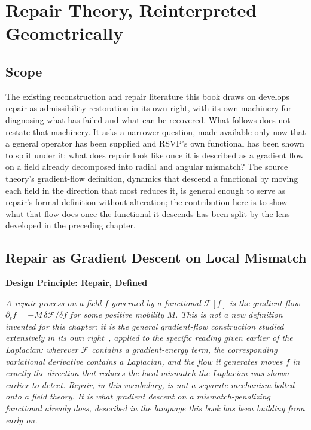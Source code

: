 \documentclass[11pt,fleqn]{book}
\numberwithin{equation}{chapter}
\newenvironment{principle}[1]
  {\begin{principleEnv}
   \noindent\textbf{Design Principle: #1}\par\smallskip\itshape}
  {\end{principleEnv}}
\theoremstyle{plain}
\theoremstyle{definition}
\theoremstyle{remark}
\begin{document}

\chapter{Repair Theory, Reinterpreted Geometrically}

\section{Scope}

The existing reconstruction and repair literature this book draws on develops repair as admissibility restoration in its own right, with its own machinery for diagnosing what has failed and what can be recovered. What follows does not restate that machinery. It asks a narrower question, made available only now that a general operator has been supplied and RSVP's own functional has been shown to split under it: what does repair look like once it is described as a gradient flow on a field already decomposed into radial and angular mismatch? The source theory's gradient-flow definition, dynamics that descend a functional by moving each field in the direction that most reduces it, is general enough to serve as repair's formal definition without alteration; the contribution here is to show what that flow does once the functional it descends has been split by the lens developed in the preceding chapter.

\section{Repair as Gradient Descent on Local Mismatch}

\begin{principle}{Repair, Defined}
A repair process on a field \(f\) governed by a functional \(\mathcal F[f]\) is the gradient flow \(\partial_t f = -M\,\delta\mathcal F/\delta f\) for some positive mobility \(M\). This is not a new definition invented for this chapter; it is the general gradient-flow construction studied extensively in its own right~\cite{ambrosio2008}, applied to the specific reading given earlier of the Laplacian: wherever \(\mathcal F\) contains a gradient-energy term, the corresponding variational derivative contains a Laplacian, and the flow it generates moves \(f\) in exactly the direction that reduces the local mismatch the Laplacian was shown earlier to detect. Repair, in this vocabulary, is not a separate mechanism bolted onto a field theory. It is what gradient descent on a mismatch-penalizing functional already does, described in the language this book has been building from early on.
\end{principle}
\end{document}

